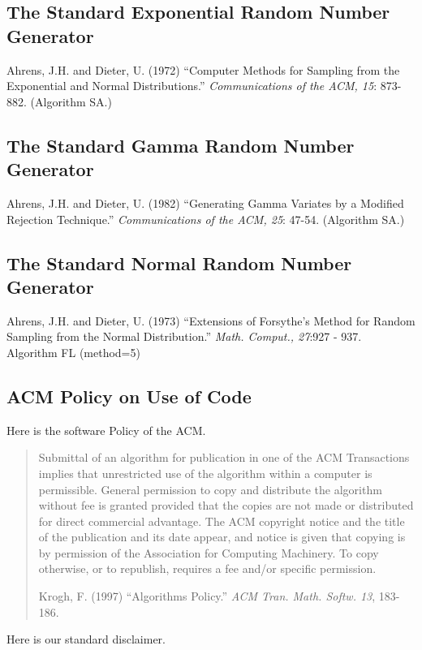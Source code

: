 \documentclass[12pt,dvips]{article}
\newcommand{\mysubsection}[1] {\color{green}
            \subsection{#1} \normalcolor}
\begin{document}
\mysubsection{The Standard Exponential Random Number Generator}

Ahrens,  J.H.  and Dieter, U.  (1972)  ``Computer Methods for Sampling
from the Exponential and  Normal Distributions.''  {\em Communications
of the ACM, 15}: 873-882.  (Algorithm SA.)

\mysubsection{The Standard Gamma Random Number Generator}

Ahrens, J.H. and  Dieter, U. (1982) ``Generating  Gamma Variates by  a
Modified Rejection Technique.''  {\em Communications  of the ACM, 25}:
47-54.  (Algorithm SA.)

\mysubsection{The Standard Normal Random Number Generator}

Ahrens, J.H.  and Dieter, U.  (1973) ``Extensions of Forsythe's Method
for    Random Sampling   from   the     Normal  Distribution.''   {\em
Math. Comput., 27}:927 - 937.  Algorithm FL (method=5)

\mysubsection{ACM Policy on Use of Code}

Here  is the  software Policy of  the  ACM.

\begin{quote}

     Submittal of  an  algorithm    for publication  in   one of   the  ACM
     Transactions implies that unrestricted use  of the algorithm within  a
     computer is permissible.   General permission  to copy and  distribute
     the algorithm without fee is granted provided that the copies  are not
     made  or   distributed for  direct   commercial  advantage.    The ACM
     copyright notice and the title of the publication and its date appear,
     and  notice is given that copying  is by permission of the Association
     for Computing Machinery.  To copy otherwise, or to republish, requires
     a fee and/or specific permission.

     Krogh, F.  (1997) ``Algorithms  Policy.''  {\em ACM  Tran.  Math.
     Softw.  13}, 183-186.

\end{quote}

Here is our standard disclaimer.
\end{document}
